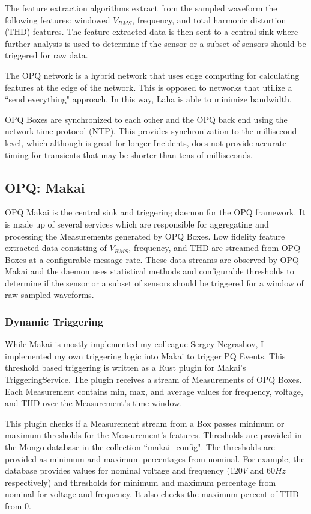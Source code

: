The feature extraction algorithms extract from the sampled waveform the following features: windowed $V_{RMS}$, frequency, and total harmonic distortion (THD) features. The feature extracted data is then sent to a central sink where further analysis is used to determine if the sensor or a subset of sensors should be triggered for raw data.

The OPQ network is a hybrid network that uses edge computing for calculating features at the edge of the network. This is opposed to networks that utilize a ``send everything" approach. In this way, Laha is able to minimize bandwidth.

OPQ Boxes are synchronized to each other and the OPQ back end using the network time protocol (NTP). This provides synchronization to the millisecond level, which although is great for longer Incidents, does not provide accurate timing for transients that may be shorter than tens of milliseconds.

\subsection{OPQ: Makai}\label{subsec:opq:-makai}
OPQ Makai is the central sink and triggering daemon for the OPQ framework. It is made up of several services which are responsible for aggregating and processing the Measurements generated by OPQ Boxes. Low fidelity feature extracted data consisting of $V_{RMS}$, frequency, and THD are streamed from OPQ Boxes at a configurable message rate. These data streams are observed by OPQ Makai and the daemon uses statistical methods and configurable thresholds to determine if the sensor or a subset of sensors should be triggered for a window of raw sampled waveforms.

\subsubsection{Dynamic Triggering}\label{subsubsec:dynamic-triggering}

While Makai is mostly implemented my colleague Sergey Negrashov, I implemented my own triggering logic into Makai to trigger PQ Events. This threshold based triggering is written as a Rust plugin for Makai's TriggeringService. The plugin receives a stream of Measurements of OPQ Boxes. Each Measurement contains min, max, and average values for frequency, voltage, and THD over the Measurement's time window.

This plugin checks if a Measurement stream from a Box passes minimum or maximum thresholds for the Measurement's features. Thresholds are provided in the Mongo database in the collection ``makai\_config". The thresholds are provided as minimum and maximum percentages from nominal. For example, the database provides values for nominal voltage and frequency (120$V$ and 60$Hz$ respectively) and thresholds for minimum and maximum percentage from nominal for voltage and frequency. It also checks the maximum percent of THD from 0.

